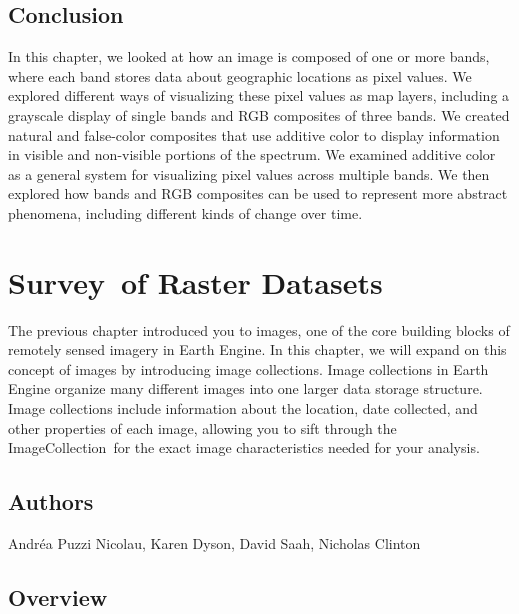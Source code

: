 \documentclass[
  letterpaper,
  DIV=11,
  numbers=noendperiod]{scrreprt}
\begin{document}
\hypertarget{conclusion-1}{%
\section*{Conclusion}\label{conclusion-1}}


In this chapter, we looked at how an image is composed of one or more
bands, where each band stores data about geographic locations as pixel
values. We explored different ways of visualizing these pixel values as
map layers, including a grayscale display of single bands and RGB
composites of three bands. We created natural and false-color composites
that use additive color to display information in visible and
non-visible portions of the spectrum. We examined additive color as a
general system for visualizing pixel values across multiple bands. We
then explored how bands and RGB composites can be used to represent more
abstract phenomena, including different kinds of change over time.

\hypertarget{survey-of-raster-datasets}{%
\chapter{Survey~of Raster Datasets}\label{survey-of-raster-datasets}}

The previous chapter introduced you to images, one of the core building
blocks of remotely sensed imagery in Earth Engine. In this chapter, we
will expand on this concept of images by introducing image collections.
Image collections in Earth Engine organize many different images into
one larger data storage structure. Image collections include information
about the location, date collected, and other properties of each image,
allowing you to sift through the ImageCollection~for the exact image
characteristics needed for your analysis.

\hypertarget{authors}{%
\section*{Authors}\label{authors}}


Andréa Puzzi Nicolau, Karen Dyson, David Saah, Nicholas Clinton

\hypertarget{overview-2}{%
\section*{Overview}\label{overview-2}}
\end{document}
